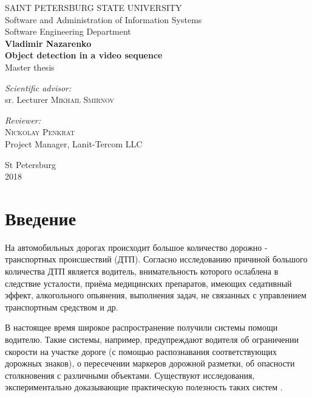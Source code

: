 \documentclass[aps,%
14pt,%
final,%
oneside,
onecolumn,%
musixtex, %
superscriptaddress,%
centertags]{extarticle} %
\begin{document}
\begin{titlepage} 
\begin{center}
{\large SAINT PETERSBURG STATE UNIVERSITY} \\[1.0cm]
{\large Software and Administration of Information Systems} \\[0.2cm]
{\large Software Engineering Department} \\[3.5cm]
 
\textbf{\Large Vladimir Nazarenko} \\[1cm]
\textbf{\LARGE Object detection in a video sequence}\\[1.0cm]
{\Large Master thesis} \\[3.5cm]

\begin{flushright} \large
\emph{Scientific advisor:} \\
sr. Lecturer \textsc{Mikhail Smirnov}
\end{flushright}
 \begin{flushright} \large
\emph{Reviewer:} \\
\textsc{Nickolay Penkrat} \\
Project Manager, Lanit-Tercom LLC
\end{flushright}
\vfill 

{\large {St Petersburg}} \\[2mm]
{\large {2018}}
\end{center} 
\end{titlepage}

\tableofcontents

\setcounter{page}{3}

\newpage

\section*{Введение}

На автомобильных дорогах происходит большое количество дорожно - транспортных происшествий (ДТП). Согласно исследованию \cite{staubach2009factors} причиной большого количества ДТП является водитель, внимательность которого ослаблена в следствие усталости, приёма медицинских препаратов, имеющих седативный эффект, алкогольного опьянения, выполнения задач, не связанных с управлением транспортным средством и др.

В настоящее время широкое распространение получили системы помощи водителю\cite{Shaout2011AdvancedDA}. Такие системы, например, предупреждают водителя об ограничении скорости на участке дороге (с помощью распознавания соответствующих дорожных знаков), о пересечении маркеров дорожной разметки, об опасности столкновения с различными объектами\cite{lu2005technical}. Существуют исследования, экспериментально доказывающие практическую полезность таких систем \cite{maag2012studying}.
\end{document}
